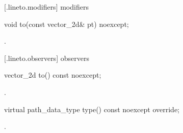  [\iotwod.lineto.modifiers]{ modifiers}

\begin{itemdecl}
    void to(const vector_2d& pt) noexcept;
\end{itemdecl}
\begin{itemdescr}
	\pnum
	\postconditions
	.
	
\end{itemdescr}

 [\iotwod.lineto.observers]{ observers}

\begin{itemdecl}
    vector_2d to() const noexcept;
\end{itemdecl}
\begin{itemdescr}
	\pnum
	\returns
	.

\end{itemdescr}

\begin{itemdecl}
    virtual path_data_type type() const noexcept override;
\end{itemdecl}
\begin{itemdescr}
	\pnum
	\returns
	.

\end{itemdescr}
